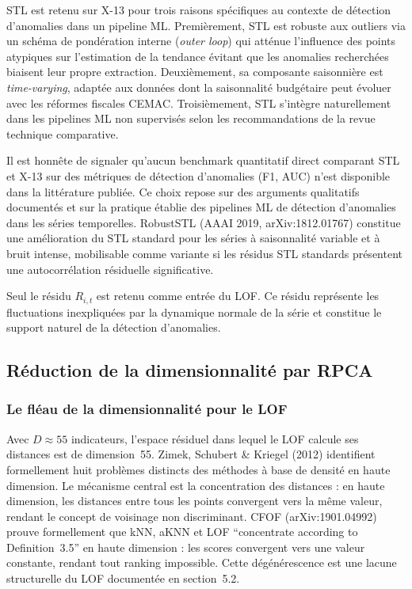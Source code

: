 \documentclass[12pt,a4paper]{article}
\begin{document}
STL est retenu sur X-13 pour trois raisons spécifiques au contexte de
détection d'anomalies dans un pipeline ML. Premièrement, STL est robuste
aux outliers via un schéma de pondération interne (\textit{outer loop}) qui
atténue l'influence des points atypiques sur l'estimation de la tendance 
évitant que les anomalies recherchées biaisent leur propre extraction.
Deuxièmement, sa composante saisonnière est \textit{time-varying}, adaptée
aux données dont la saisonnalité budgétaire peut évoluer avec les réformes
fiscales CEMAC. Troisièmement, STL s'intègre naturellement dans les pipelines
ML non supervisés selon les recommandations de la revue technique comparative.

Il est honnête de signaler qu'aucun benchmark quantitatif direct comparant
STL et X-13 sur des métriques de détection d'anomalies (F1, AUC) n'est
disponible dans la littérature publiée. Ce choix repose sur des arguments
qualitatifs documentés et sur la pratique établie des pipelines ML de
détection d'anomalies dans les séries temporelles. RobustSTL (AAAI 2019,
arXiv:1812.01767) constitue une amélioration du STL standard pour les séries
à saisonnalité variable et à bruit intense, mobilisable comme variante si
les résidus STL standards présentent une autocorrélation résiduelle
significative.

Seul le résidu $R_{i,t}$ est retenu comme entrée du LOF. Ce résidu représente
les fluctuations inexpliquées par la dynamique normale de la série et constitue
le support naturel de la détection d'anomalies.

\subsection{Réduction de la dimensionnalité par RPCA}

\subsubsection{Le fléau de la dimensionnalité pour le LOF}

Avec $D \approx 55$ indicateurs, l'espace résiduel dans lequel le LOF calcule
ses distances est de dimension~55. Zimek, Schubert \& Kriegel (2012) identifient
formellement huit problèmes distincts des méthodes à base de densité en haute
dimension. Le mécanisme central est la concentration des distances : en haute
dimension, les distances entre tous les points convergent vers la même valeur,
rendant le concept de voisinage non discriminant. CFOF (arXiv:1901.04992) prouve
formellement que kNN, aKNN et LOF ``concentrate according to Definition~3.5''
en haute dimension : les scores convergent vers une valeur constante, rendant
tout ranking impossible. Cette dégénérescence est une lacune structurelle du
LOF documentée en section~5.2.
\end{document}
